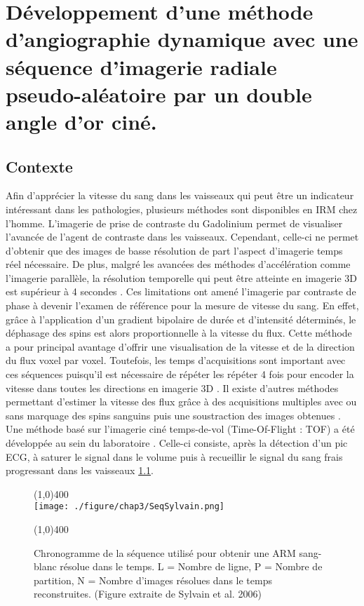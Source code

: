 \chapter{Développement d'une méthode d'angiographie dynamique avec une séquence d'imagerie radiale pseudo-aléatoire par un double angle d'or ciné.}

\section{Contexte}

Afin d'apprécier la vitesse du sang dans les vaisseaux qui peut être un indicateur intéressant dans les pathologies, plusieurs méthodes sont disponibles en IRM chez l'homme. L'imagerie de prise de contraste du Gadolinium permet de visualiser l'avancée de l'agent de contraste dans les vaisseaux. Cependant, celle-ci ne permet d'obtenir que des images de basse résolution de part l'aspect d'imagerie temps réel nécessaire. De plus, malgré les avancées des méthodes d'accélération comme l'imagerie parallèle, la résolution temporelle qui peut être atteinte en imagerie 3D est supérieur à 4 secondes \cite{Grist:2012fk}.
Ces limitations ont amené l'imagerie par contraste de phase à devenir l'examen de référence pour la mesure de vitesse du sang. En effet, grâce à l'application d'un gradient bipolaire de durée et d'intensité déterminés, le déphasage des spins est alors proportionnelle à la vitesse du flux. Cette méthode a pour principal avantage d'offrir une visualisation de la vitesse et de la direction du flux voxel par voxel. Toutefois, les temps d'acquisitions sont important avec ces séquences puisqu'il est nécessaire de répéter les répéter 4 fois pour encoder la vitesse dans toutes les directions en imagerie 3D \cite{Wu:2013ys,Robson:2010uq,Johnson:2010uq}.
Il existe d'autres méthodes permettant d'estimer la vitesse des flux grâce à des acquisitions multiples avec ou sans marquage des spins sanguins puis une soustraction des images obtenues \cite{Koktzoglou:2009fe}.
Une méthode basé sur l'imagerie ciné temps-de-vol (Time-Of-Flight : TOF) a été développée au sein du laboratoire \cite{Miraux:2006fu}. Celle-ci consiste, après la détection d'un pic ECG, à saturer le signal dans le volume puis à recueillir le signal du sang frais progressant dans les vaisseaux \ref{fig:SeqSylvain}. 

\begin{figure}[H]
\centering
\line(1,0){400} \\
\texttt{[image: ./figure/chap3/SeqSylvain.png]}
\caption[Séquence ARM Sylvain et al.]{\label{fig:SeqSylvain} Chronogramme de la séquence utilisé pour obtenir une ARM sang-blanc résolue dans le temps. L = Nombre de ligne, P = Nombre de partition, N = Nombre d'images résolues dans le temps reconstruites. (Figure extraite de Sylvain et al. 2006)}
\line(1,0){400} \\ \end{figure}

